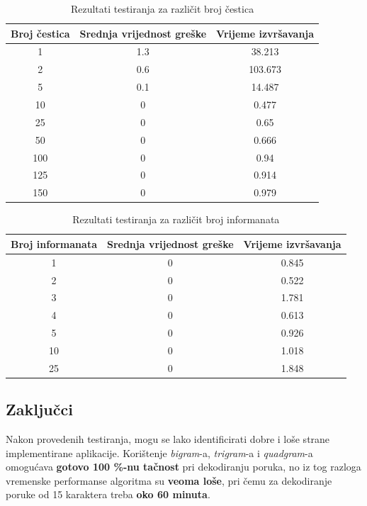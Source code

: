 \documentclass[12pt, a4paper]{article}
\begin{document}
\begin{table}[H]
\centering
\begin{tabular}{| c | c | c |} \hline
\textbf{Broj čestica}		& \textbf{Srednja vrijednost greške}	& \textbf{Vrijeme izvršavanja}		\\ \hline
1						& 1.3								& 38.213							\\ \hline
2						& 0.6								& 103.673							\\ \hline
5						& 0.1								& 14.487							\\ \hline
10						& 0									& 0.477								\\ \hline
25						& 0									& 0.65								\\ \hline
50						& 0									& 0.666								\\ \hline
100						& 0									& 0.94								\\ \hline
125						& 0									& 0.914								\\ \hline
150						& 0									& 0.979								\\ \hline
\end{tabular}
\caption{Rezultati testiranja za različit broj čestica}
\label{cestice}
\end{table}

\begin{table}[H]
\centering
\begin{tabular}{| c | c | c |} \hline
\textbf{Broj informanata}	& \textbf{Srednja vrijednost greške}	& \textbf{Vrijeme izvršavanja}	\\ \hline
1						& 0									& 0.845							\\ \hline
2						& 0									& 0.522							\\ \hline
3						& 0									& 1.781							\\ \hline
4						& 0									& 0.613							\\ \hline
5						& 0									& 0.926							\\ \hline
10						& 0									& 1.018							\\ \hline
25						& 0									& 1.848							\\ \hline
\end{tabular}
\caption{Rezultati testiranja za različit broj informanata}
\label{informanti}
\end{table}

\subsection{Zaključci}

Nakon provedenih testiranja, mogu se lako identificirati dobre i loše strane implementirane aplikacije. Korištenje \textit{bigram}-a, \textit{trigram}-a i \textit{quadgram}-a omogućava \textbf{gotovo 100 \%-nu tačnost} pri dekodiranju poruka, no iz tog razloga vremenske performanse algoritma su \textbf{veoma loše}, pri čemu za dekodiranje poruke od 15 karaktera treba \textbf{oko 60 minuta}. \\
\end{document}
